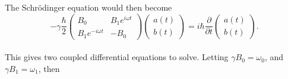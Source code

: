 The Schr\"{o}dinger equation would then become
\begin{equation}
-\gamma \frac{\hbar}{2}\begin{pmatrix} B_{0} & B_{1}e^{i\omega t} \\ B_{1}e^{-i\omega t} & -B_{0} \end{pmatrix} \begin{pmatrix} a(t) \\ b(t) \end{pmatrix} = i\hbar\frac{\partial}{\partial t} \begin{pmatrix} a(t) \\ b(t) \end{pmatrix}.
\end{equation} 
\\
This gives two coupled differential equations to solve.  Letting
$\gamma B_{0} = \omega_{0}$, and $\gamma B_{1} = \omega_{1}$, then

